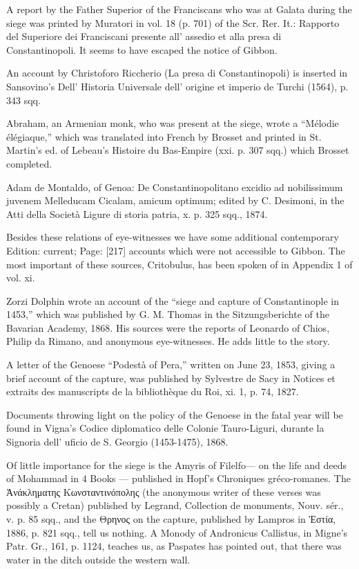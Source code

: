 A report by the Father Superior of the Franciscans who was at Galata during the siege was printed by Muratori in vol. 18 (p. 701) of the Scr. Rer. It.: Rapporto del Superiore dei Franciscani presente all\texthebrew{}’ assedio et alla presa di Constantinopoli. It seems to have escaped the notice of Gibbon.

An account by Christoforo Riccherio (La presa di Constantinopoli) is inserted in Sansovino\texthebrew{}’s Dell\texthebrew{}’ Historia Universale dell\texthebrew{}’ origine et imperio de Turchi (1564), p. 343 sqq.

Abraham, an Armenian monk, who was present at the siege, wrote a \texthebrew{“}Mélodie élégiaque,\texthebrew{}” which was translated into French by Brosset and printed in St. Martin\texthebrew{}’s ed. of Lebeau\texthebrew{}’s Histoire du Bas-Empire (xxi. p. 307 sqq.) which Brosset completed.

Adam de Montaldo, of Genoa: De Constantinopolitano excidio ad nobilissimum juvenem Melleducam Cicalam, amicum optimum; edited by C. Desimoni, in the Atti della Società Ligure di storia patria, x. p. 325 sqq., 1874.

Besides these relations of eye-witnesses we have some additional contemporary Edition: current; Page: [217] accounts which were not accessible to Gibbon. The most important of these sources, Critobulus, has been spoken of in Appendix 1 of vol. xi.

Zorzi Dolphin wrote an account of the \texthebrew{“}siege and capture of Constantinople in 1453,\texthebrew{}” which was published by G. M. Thomas in the Sitzungsberichte of the Bavarian Academy, 1868. His sources were the reports of Leonardo of Chios, Philip da Rimano, and anonymous eye-witnesses. He adds little to the story.

A letter of the Genoese \texthebrew{“}Podestà of Pera,\texthebrew{}” written on June 23, 1853, giving a brief account of the capture, was published by Sylvestre de Sacy in Notices et extraits des manuscripts de la bibliothèque du Roi, xi. 1, p. 74, 1827.

Documents throwing light on the policy of the Genoese in the fatal year will be found in Vigna\texthebrew{}’s Codice diplomatico delle Colonie Tauro-Liguri, durante la Signoria dell\texthebrew{}’ uficio de S. Georgio (1453-1475), 1868.

Of little importance for the siege is the Amyris of Filelfo\texthebrew{—} on the life and deeds of Mohammad in 4 Books \texthebrew{—} published in Hopf\texthebrew{}’s Chroniques gréco-romanes. The \textgreek{\texthebrew{Ἀ}νάκληματης Κωνσταντινόπολης} (the anonymous writer of these verses was possibly a Cretan) published by Legrand, Collection de monuments, Nouv. sér., v. p. 85 sqq., and the \textgreek{Θρηνος} on the capture, published by Lampros in \textgreek{\texthebrew{Ἑ}στία}, 1886, p. 821 sqq., tell us nothing. A Monody of Andronicus Callistus, in Migne\texthebrew{}’s Patr. Gr., 161, p. 1124, teaches us, as Paspates has pointed out, that there was water in the ditch outside the western wall.

